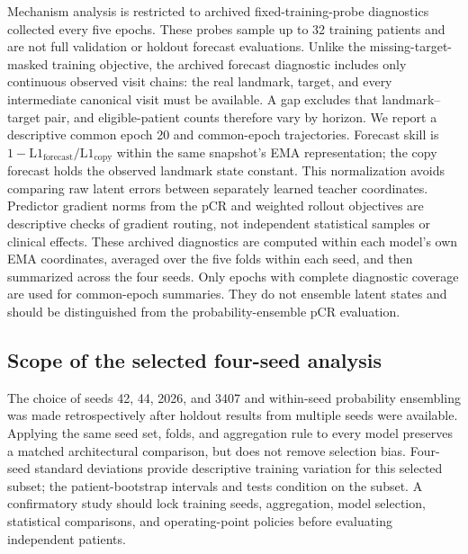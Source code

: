 Mechanism analysis is restricted to archived fixed-training-probe diagnostics collected every five epochs. These probes sample up to 32 training patients and are not full validation or holdout forecast evaluations. Unlike the missing-target-masked training objective, the archived forecast diagnostic includes only continuous observed visit chains: the real landmark, target, and every intermediate canonical visit must be available. A gap excludes that landmark--target pair, and eligible-patient counts therefore vary by horizon. We report a descriptive common epoch 20 and common-epoch trajectories. Forecast skill is $1-\mathrm{L1}_{\mathrm{forecast}}/\mathrm{L1}_{\mathrm{copy}}$ within the same snapshot's EMA representation; the copy forecast holds the observed landmark state constant. This normalization avoids comparing raw latent errors between separately learned teacher coordinates. Predictor gradient norms from the pCR and weighted rollout objectives are descriptive checks of gradient routing, not independent statistical samples or clinical effects. These archived diagnostics are computed within each model's own EMA coordinates, averaged over the five folds within each seed, and then summarized across the four seeds. Only epochs with complete diagnostic coverage are used for common-epoch summaries. They do not ensemble latent states and should be distinguished from the probability-ensemble pCR evaluation.

\subsection{Scope of the selected four-seed analysis}
The choice of seeds 42, 44, 2026, and 3407 and within-seed probability ensembling was made retrospectively after holdout results from multiple seeds were available. Applying the same seed set, folds, and aggregation rule to every model preserves a matched architectural comparison, but does not remove selection bias. Four-seed standard deviations provide descriptive training variation for this selected subset; the patient-bootstrap intervals and tests condition on the subset. A confirmatory study should lock training seeds, aggregation, model selection, statistical comparisons, and operating-point policies before evaluating independent patients.
